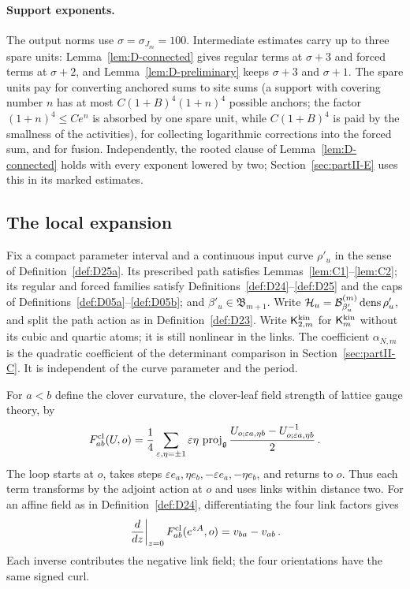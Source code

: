 \paragraph{Support exponents.} The output norms use $\sigma=\sigma_{J_m}=100$. Intermediate estimates carry up to three spare units: Lemma~\ref{lem:D-connected} gives regular terms at $\sigma+3$ and forced terms at $\sigma+2$, and Lemma~\ref{lem:D-preliminary} keeps $\sigma+3$ and $\sigma+1$. The spare units pay for converting anchored sums to site sums (a support with covering number $n$ has at most $C(1+B)^4(1+n)^4$ possible anchors; the factor $(1+n)^4\le Ce^n$ is absorbed by one spare unit, while $C(1+B)^4$ is paid by the smallness of the activities), for collecting logarithmic corrections into the forced sum, and for fusion. Independently, the rooted clause of Lemma~\ref{lem:D-connected} holds with every exponent lowered by two; Section~\ref{sec:partII-E} uses this in its marked estimates.


\subsection{The local expansion}\label{subsec:D-local}

Fix a compact parameter interval and a continuous input curve $\rho'_u$ in the sense of Definition~\ref{def:D25a}. Its prescribed path satisfies Lemmas~\ref{lem:C1}--\ref{lem:C2}; its regular and forced families satisfy Definitions~\ref{def:D24}--\ref{def:D25} and the caps of Definitions~\ref{def:D05a}--\ref{def:D05b}; and $\beta'_u\in\mathfrak B_{m+1}$. Write $\mathcal H_u=\mathcal{B}^{(m)}_{\beta'_u}\operatorname{dens}\rho'_u$, and split the path action as in Definition~\ref{def:D23}. Write $\mathsf K_{2,m}^{\rm kin}$ for $\mathsf K_m^{\rm kin}$ without its cubic and quartic atoms; it is still nonlinear in the links. The coefficient $\alpha_{N,m}$ is the quadratic coefficient of the determinant comparison in Section~\ref{sec:partII-C}. It is independent of the curve parameter and the period.

For $a<b$ define the clover curvature, the clover-leaf field strength of lattice gauge theory, by
\begin{equation*}
F^{\rm cl}_{ab}(U,o)=\frac14\sum_{\varepsilon,\eta=\pm1}\varepsilon\eta\,
\operatorname{proj}_{\mathfrak{g}}\frac{U_{o;\varepsilon a,\eta b}-U_{o;\varepsilon a,\eta b}^{-1}}2\,.
\end{equation*}
The loop starts at $o$, takes steps $\varepsilon e_a,\eta e_b,-\varepsilon e_a,-\eta e_b$, and returns to $o$. Thus each term transforms by the adjoint action at $o$ and uses links within distance two. For an affine field as in Definition~\ref{def:D24}, differentiating the four link factors gives
\begin{equation}\label{eq:D-clover-linear}
\left.\frac d{dz}\right|_{z=0}F^{\rm cl}_{ab}(e^{zA},o)=v_{ba}-v_{ab}\,.
\end{equation}
Each inverse contributes the negative link field; the four orientations have the same signed curl.

